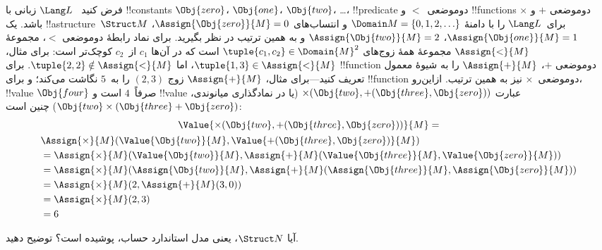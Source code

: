 \documentclass[../../../include/open-logic-section]{subfiles}
\begin{document}
\begin{ex}
فرض کنید ~$\Lang L$ زبانی با !!{constant}s $\Obj{zero}$،
$\Obj{one}$، $\Obj{two}$، \dots، !!{predicate} دوموضعی~$<$ و
!!{function}s دوموضعی $+$ و $\times$ باشد. یک !!a{structure}~$\Struct
M$ برای~$\Lang L$ را با دامنهٔ $\Domain M = \{0, 1, 2, \ldots
\}$ و انتساب‌های $\Assign{\Obj{zero}}{M} = 0$،
$\Assign{\Obj{one}}{M} = 1$، $\Assign{\Obj{two}}{M} = 2$ و به همین
ترتیب در نظر بگیرید. برای نماد رابطهٔ دوموضعی $<$، مجموعهٔ
$\Assign{<}{M}$ مجموعهٔ همهٔ زوج‌های
$\tuple{c_1, c_2} \in \Domain{M}^2$ است که در آن‌ها $c_1$ از~$c_2$
کوچک‌تر است: برای مثال، $\tuple{1, 3} \in \Assign{<}{M}$، اما
$\tuple{2, 2} \notin \Assign{<}{M}$. برای !!{function} دوموضعی $+$،
$\Assign{+}{M}$ را به شیوهٔ معمول تعریف کنید---برای مثال،
$\Assign{+}{M}$ زوج $(2,3)$ را به~$5$ نگاشت می‌کند؛ و برای
!!{function} دوموضعی~$\times$ نیز به همین ترتیب. ازاین‌رو، !!{value}
$\Obj{four}$ صرفاً~$4$ است و !!{value} عبارت
$\times(\Obj{two}, +(\Obj{three},\Obj{zero}))$ (یا در نمادگذاری
میانوندی، $\Obj{two} \times (\Obj{three} + \Obj{zero})$) چنین است:
\begin{multline*}
\Value{\times(\Obj{two}, +(\Obj{three},\Obj{zero}))}{M} =\\
\begin{aligned}
&\Assign{\times}{M}(\Value{\Obj{two}}{M}, \Value{+(\Obj{three}, \Obj{zero})}{M})\\
& = \Assign{\times}{M}(\Value{\Obj{two}}{M}, \Assign{+}{M}(\Value{\Obj{three}}{M},
\Value{\Obj{zero}}{M})) \\
& = \Assign{\times}{M}(\Assign{\Obj{two}}{M}, \Assign{+}{M}(\Assign{\Obj{three}}{M},
\Assign{\Obj{zero}}{M})) \\
& = \Assign{\times}{M}(2, \Assign{+}{M}(3, 0)) \\
& = \Assign{\times}{M}(2, 3) \\
& = 6
\end{aligned}
\end{multline*}
\end{ex}

\begin{prob}
آیا $\Struct N$، یعنی مدل استاندارد حساب، پوشیده است؟ توضیح دهید.
\end{prob}
\end{document}

